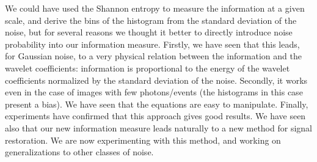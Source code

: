 \documentclass[11pt,a4paper]{article}
\begin{document}
We could
have used the Shannon entropy to measure the information at a given scale,
and derive the bins of the histogram from the standard deviation of the noise,
but for several reasons we thought it better to directly introduce 
noise probability into our information measure. 
Firstly, we have seen that this leads, for Gaussian noise, to
a very physical relation between the information and the wavelet coefficients:
information is proportional to the energy of the wavelet coefficients
normalized by the standard deviation of the noise. 
Secondly, it works even in the case
of images with few photons/events (the histograms in this case present a bias).
We have seen that the equations are easy to manipulate. 
Finally, experiments have 
confirmed that this approach gives good results.
We have seen also that our new information
measure leads naturally to a new method for signal restoration. 
We are now experimenting with this method, and working on generalizations to
other classes of noise.

\newpage
% 
% 
\end{document}
